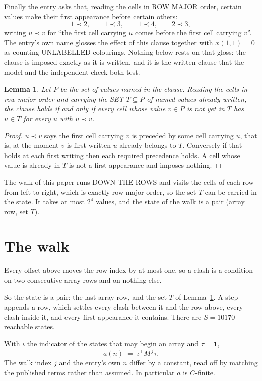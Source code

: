 \documentclass[11pt,a4paper]{article}
\theoremstyle{plain}
\newtheorem{lemma}[theorem]{Lemma}
\theoremstyle{definition}
\begin{document}
Finally the entry asks that, reading the cells in ROW MAJOR order, certain values make their
first appearance before certain others:
\[
1\prec 2,\qquad 1\prec 3,\qquad 1\prec 4,\qquad 2\prec 3 ,
\]
writing $u\prec v$ for ``the first cell carrying $u$ comes before the first cell carrying
$v$''. The entry's own name glosses the effect of this clause together with $x(1,1)=0$ as
counting UNLABELLED colourings. Nothing below rests on that gloss: the clause is imposed
exactly as it is written, and it is the written clause that the model and the independent
check both test.

\begin{lemma}\label{lem:seen}
Let $P$ be the set of values named in the clause. Reading the cells in row major order and
carrying the SET $T\subseteq P$ of named values already written, the clause holds if and only
if every cell whose value $v\in P$ is not yet in $T$ has $u\in T$ for every $u$ with $u\prec v$.
\end{lemma}

\begin{proof}
$u\prec v$ says the first cell carrying $v$ is preceded by some cell carrying $u$, that is, at
the moment $v$ is first written $u$ already belongs to $T$. Conversely if that holds at each
first writing then each required precedence holds. A cell whose value is already in $T$ is not
a first appearance and imposes nothing.
\end{proof}

The walk of this paper runs DOWN THE ROWS and visits the cells of each row from left to right,
which is exactly row major order, so the set $T$ can be carried in the state. It takes at most
$2^{4}$ values, and the state of the walk is a pair (array row, set $T$).

\section{The walk}

Every offset above moves the row index by at most one, so a clash is a condition on two
consecutive array rows and on nothing else.

So the state is a pair: the last array row, and the set $T$ of Lemma~\ref{lem:seen}. A step
appends a row, which settles every clash between it and the row above, every clash inside it,
and every first appearance it contains. There are $S=10170$ reachable states.

With $\iota$ the indicator of the states that may begin an array and $\tau=\mathbf{1}$,
\[
a(n)\;=\;\iota^{\!\top}M^{\,j}\tau .
\]
The walk index $j$ and the entry's own $n$ differ by a constant, read off by matching the
published terms rather than assumed. In particular $a$ is $C$-finite.
\end{document}
